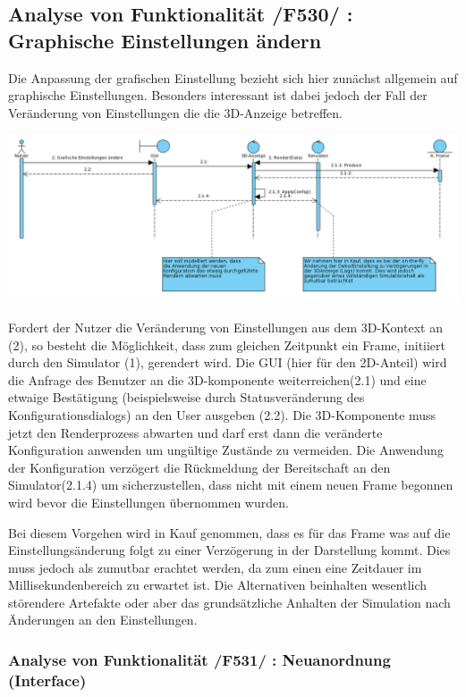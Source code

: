 \subsection{Analyse von Funktionalität /F530/ :  Graphische Einstellungen ändern}
Die Anpassung der grafischen Einstellung bezieht sich hier zunächst allgemein auf graphische Einstellungen. Besonders interessant ist dabei jedoch der Fall der Veränderung von Einstellungen die 
die 3D-Anzeige betreffen. 

\includegraphics[width=16cm]{bilder/change_graphic_config}

Fordert der Nutzer die Veränderung von Einstellungen aus dem 3D-Kontext an (2), so besteht die Möglichkeit, dass zum gleichen Zeitpunkt ein Frame, initiiert durch den Simulator (1), gerendert wird. 
Die GUI (hier für den 2D-Anteil) wird die Anfrage des Benutzer an die 3D-komponente weiterreichen(2.1) und eine etwaige Bestätigung (beispielsweise durch Statusveränderung des Konfigurationsdialogs) an den 
User ausgeben (2.2). Die 3D-Komponente muss jetzt den Renderprozess abwarten und darf erst dann die veränderte Konfiguration anwenden um ungültige Zustände zu vermeiden. Die Anwendung der Konfiguration verzögert 
die Rückmeldung der Bereitschaft an den Simulator(2.1.4) um sicherzustellen, dass nicht mit einem neuen Frame begonnen wird bevor die Einstellungen übernommen wurden. 

Bei diesem Vorgehen wird in Kauf genommen, dass es für das Frame was auf die Einstellungsänderung folgt zu einer Verzögerung in der Darstellung kommt. Dies muss jedoch als zumutbar erachtet werden, da zum einen
eine Zeitdauer im Millisekundenbereich zu erwartet ist. Die Alternativen beinhalten wesentlich störendere Artefakte oder aber das grundsätzliche Anhalten der Simulation nach Änderungen an den Einstellungen.

\subsubsection{Analyse von Funktionalität /F531/ :   Neuanordnung (Interface)}
